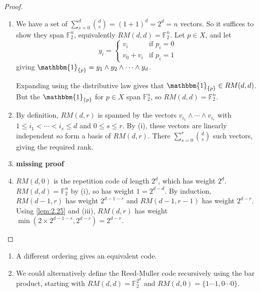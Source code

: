 \documentclass{article}
\newcommand{\F}{\mathbb{F}}
\newcommand{\1}[1]{\mathbbm{1}_{#1}}
\begin{document}
\begin{proof}
    \leavevmode
    \begin{enumerate}[label=(\roman*)]
        \item We have a set of $\sum_{s=0}^d \binom{d}{s} = (1+1)^d = 2^d = n$ vectors.
            So it suffices to show they span $\F_2^n$, equivalently $RM(d, d) = \F_2^n$.
            Let $p \in X$, and let
            \begin{equation*}
                y_i =
                \begin{cases}
                    v_i & \text{if } p_i = 0 \\
                    v_0 + v_i & \text{if } p_i = 1
                \end{cases}
            \end{equation*}
            giving $\1{\{p\}} = y_1 \wedge y_2 \wedge \dotsb \wedge y_d$.

            Expanding using the distributive law gives that $\1{\{p\}} \in RM(d, d)$.
            But the $\1{\{p\}}$ for $p \in X$ span $\F_2^n$, so $RM(d, d) = \F_2^n$.
        \item By definition, $RM(d, r)$ is spanned by the vectors $v_{i_1} \wedge \dotsb \wedge v_{i_s}$ with $1 \leq i_1 < \dotsb < i_s \leq d$ and $0 \leq s \leq r$.
            By (i), these vectors are linearly independent so form a basis of $RM(d, r)$.
            There $\sum_{s=0}^r \binom{d}{s}$ such vectors, giving the required rank.
        \item %
            \textbf{missing proof}
        \item $RM(d, 0)$ is the repetition code of length $2^d$, which has weight $2^d$. $RM(d, d) = \F_2^n$ by (i), so has weight $1 = 2^{d-d}$.
            By induction, $RM(d-1, r)$ has weight $2^{d-1-r}$ and $RM(d-1, r-1)$ has weight $2^{d-r}$.
            Using \cref{lem:2.25} and (iii), $RM(d, r)$ has weight $\min(2 \times 2^{d-1-r}, 2^{d-r}) = 2^{d-r}$.
    \end{enumerate}
\end{proof}
\begin{remark}\leavevmode
    \begin{enumerate}[label=(\arabic*)]
        \item A different ordering gives an equivalent code.
        \item We could alternatively define the Reed-Muller code recursively using the bar product, starting with $RM(d, d) = \F_2^{2^d}$ and $RM(d, 0)=\{1\dotsm1, 0\dotsm0\}$.
    \end{enumerate}
\end{remark}
\end{document}
